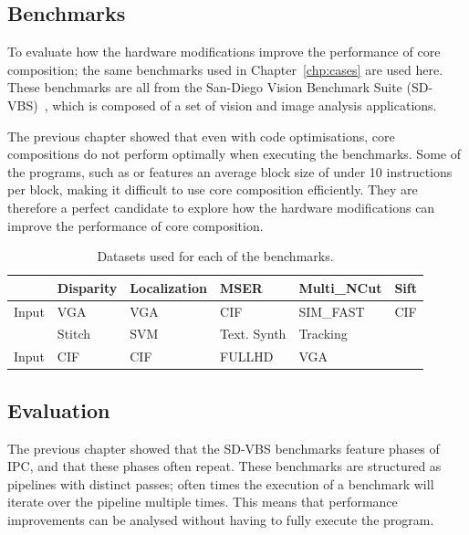 \subsection{Benchmarks}
To evaluate how the hardware modifications improve the performance of core composition; the same benchmarks used in Chapter~\ref{chp:cases} are used here.
These benchmarks are all from the San-Diego Vision Benchmark Suite (SD-VBS)~\cite{sdvbs}, which is composed of a set of vision and image analysis applications.

The previous chapter showed that even with code optimisations, core compositions do not perform optimally when executing the benchmarks.
Some of the programs, such as  or  features an average block size of under 10 instructions per block, making it difficult to use core composition efficiently.
They are therefore a perfect candidate to explore how the hardware modifications can improve the performance of core composition.

\begin{table}[t]
  \small
  \centering
 \begin{tabular} {| l | l | l | l | l | l | }
 \hline
   & \cellcolor[gray]{0.7}Disparity & \cellcolor[gray]{0.7} Localization& \cellcolor[gray]{0.7} MSER& \cellcolor[gray]{0.7} Multi\_NCut& \cellcolor[gray]{0.7} Sift\\ \hline
Input&	VGA  & VGA & CIF  & SIM\_FAST& CIF\\ \hline
	
	 & \cellcolor[gray]{0.7} Stitch & \cellcolor[gray]{0.7} SVM & \cellcolor[gray]{0.7} Text. Synth & \cellcolor[gray]{0.7} Tracking&\\ \hline
	  Input & CIF& CIF& FULLHD& VGA &\\ \hline

	\end{tabular}
  \caption{Datasets used for each of the benchmarks.}\label{tab:sd-data2}
\end{table}
\subsection{Evaluation} 
The previous chapter showed that the SD-VBS benchmarks feature phases of IPC, and that these phases often repeat.
These benchmarks are structured as pipelines with distinct passes; often times the execution of a benchmark will iterate over the pipeline multiple times.
This means that performance improvements can be analysed without having to fully execute the program.

